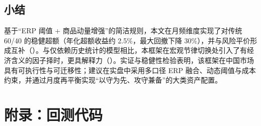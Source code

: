 \documentclass[a4paper,12pt]{article}
\numberwithin{equation}{section}
\begin{document}
\subsection{小结} \label{sec:summary4}
基于“ERP 阈值 + 商品动量增强”的简洁规则，本文在月频维度实现了对传统 60/40 的稳健超额（年化超额收益约 2.5\%，最大回撤下降 30\%），并与风险平价形成互补（\cite{HT2024_riskparity,HT2023_quant}）。与仅依赖历史统计的模型相比，本框架在宏观节律切换处引入了有经济含义的因子择时，更具解释力（\cite{CICC2024_factor}）。实证与稳健性检验表明，该框架在中国市场具有可执行性与可迁移性；建议在实盘中采用多口径 ERP 融合、动态阈值与成本约束，并通过月度再平衡实现“以守为先、攻守兼备”的大类资产配置。

\clearpage

\appendix
\section{附录：回测代码}
\end{document}
